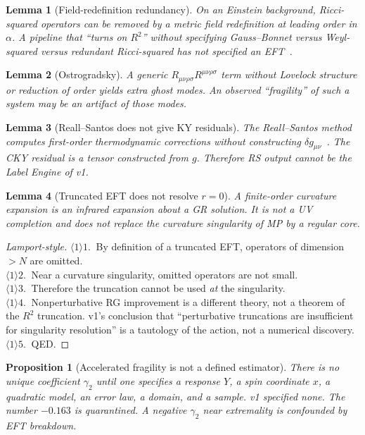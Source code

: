 \documentclass[11pt,a4paper]{article}
\newtheorem{lemma}{Lemma}[section]
\newtheorem{proposition}{Proposition}[section]
\begin{document}
\begin{lemma}[Field-redefinition redundancy]
On an Einstein background, Ricci-squared operators can be removed by a
metric field redefinition at leading order in \(\alpha\). A pipeline
that ``turns on \(R^2\)'' without specifying Gauss--Bonnet versus
Weyl-squared versus redundant Ricci-squared has not specified an
EFT~\cite{ReallSantos2019,CanoRuiperez2019}.
\end{lemma}

\begin{lemma}[Ostrogradsky]
A generic \(R_{\mu\nu\rho\sigma}R^{\mu\nu\rho\sigma}\) term without
Lovelock structure or reduction of order yields extra ghost modes. An
observed ``fragility'' of such a system may be an artifact of those
modes.
\end{lemma}

\begin{lemma}[Reall--Santos does not give KY residuals]
The Reall--Santos method computes first-order thermodynamic corrections
without constructing \(\delta g_{\mu\nu}\)~\cite{ReallSantos2019}. The
CKY residual is a tensor constructed from \(g\). Therefore RS output
cannot be the Label Engine of v1.
\end{lemma}

\begin{lemma}[Truncated EFT does not resolve \(r=0\)]
\label{lem:sing}
A finite-order curvature expansion is an infrared expansion about a GR
solution. It is not a UV completion and does not replace the curvature
singularity of MP by a regular core.
\end{lemma}

\begin{proof}[Lamport-style]
\(\langle1\rangle1.\ \) By definition of a truncated EFT, operators of
dimension \(>N\) are omitted.\\
\(\langle1\rangle2.\ \) Near a curvature singularity, omitted operators
are not small.\\
\(\langle1\rangle3.\ \) Therefore the truncation cannot be used
\emph{at} the singularity.\\
\(\langle1\rangle4.\ \) Nonperturbative RG improvement is a different
theory, not a theorem of the \(R^2\) truncation. v1's conclusion that
``perturbative truncations are insufficient for singularity resolution''
is a tautology of the action, not a numerical discovery.\\
\(\langle1\rangle5.\ \) QED.
\end{proof}

\begin{proposition}[Accelerated fragility is not a defined estimator]
There is no unique coefficient \(\gamma_2\) until one specifies a
response \(Y\), a spin coordinate \(x\), a quadratic model, an error
law, a domain, and a sample. v1 specified none. The number
\(-0.163\) is quarantined. A negative \(\gamma_2\) near extremality is
confounded by EFT breakdown.
\end{proposition}
\end{document}

